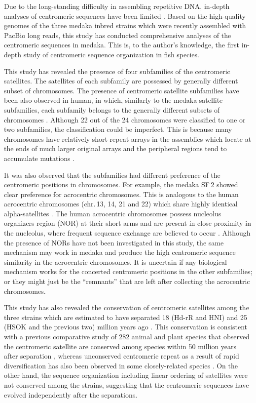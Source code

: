 Due to the long-standing difficulty in assembling repetitive DNA, in-depth analyses of centromeric sequences have been limited \cite{Plohl2014}. Based on the high-quality genomes of the three medaka inbred strains which were recently assembled with PacBio long reads, this study has conducted comprehensive analyses of the centromeric sequences in medaka. This is, to the author's knowledge, the first in-depth study of centromeric sequence organization in fish species.

This study has revealed the presence of four subfamilies of the centromeric satellites. The satellites of each subfamily are possessed by generally different subset of chromosomes. The presence of centromeric satellite subfamilies have been also observed in human, in which, similarly to the medaka satellite subfamilies, each subfamily belongs to the generally different subsets of chromosomes \cite{Alexandrov2001}. Although 22 out of the 24 chromosomes were classified to one or two subfamilies, the classification could be imperfect. This is because many chromosomes have relatively short repeat arrays in the assemblies which locate at the ends of much larger original arrays and the peripheral regions tend to accumulate mutations \cite{Smith1976, Schueler2001}.

It was also observed that the subfamilies had different preference of the centromeric positions in chromosomes. For example, the medaka SF\,2 showed clear preference for acrocentric chromosomes. This is analogous to the human acrocentric chromosomes (chr.\,13, 14, 21 and 22) which share highly identical alpha-satellites \cite{Willard1991}. The human acrocentric chromosomes possess nucleolus organizers region (NOR) at their short arms and are present in close proximity in the nucleolus, where frequent sequence exchange are believed to occur \cite{Willard1991}. Although the presence of NORs have not been investigated in this study, the same mechanism may work in medaka and produce the high centromeric sequence similarity in the acrocentric chromosomes. It is uncertain if any biological mechanism works for the concerted centromeric positions in the other subfamilies; or they might just be the ``remnants'' that are left after collecting the acrocentric chromosomes.

This study has also revealed the conservation of centromeric satellites among the three strains which are estimated to have separated 18 (Hd-rR and HNI) and 25 (HSOK and the previous two) million years ago \cite{Setiamarga2009}. This conservation is consistent with a previous comparative study of 282 animal and plant species that observed the centromeric satellite are conserved among species within 50 million years after separation \cite{Melters2013}, whereas unconserved centromeric repeat as a result of rapid diversification has also been observed in some closely-related species \cite{Lee2005}. On the other hand, the sequence organization including linear ordering of satellites were not conserved among the strains, suggesting that the centromeric sequences have evolved independently after the separations.

